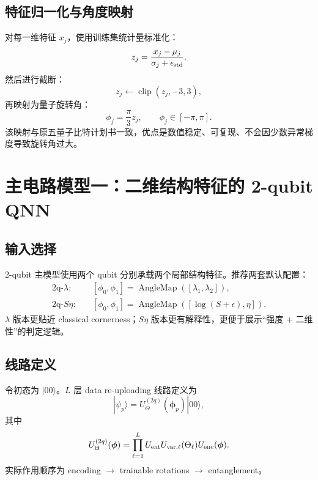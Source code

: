 \documentclass[UTF8,zihao=-4]{ctexart}
\newcommand{\clip}{\operatorname{clip}}
\begin{document}
\subsection{特征归一化与角度映射}

对每一维特征 $x_j$，使用训练集统计量标准化：
\begin{equation}
    z_j=\frac{x_j-\mu_j}{\sigma_j+\epsilon_{\rm std}}.
\end{equation}
然后进行截断：
\begin{equation}
    z_j\leftarrow \clip(z_j,-3,3),
\end{equation}
再映射为量子旋转角：
\begin{equation}
    \phi_j=\frac{\pi}{3} z_j,
    \qquad \phi_j\in[-\pi,\pi].
\end{equation}
该映射与原五量子比特计划书一致，优点是数值稳定、可复现、不会因少数异常梯度导致旋转角过大。

\section{主电路模型一：二维结构特征的 2-qubit QNN}

\subsection{输入选择}

2-qubit 主模型使用两个 qubit 分别承载两个局部结构特征。推荐两套默认配置：
\begin{align}
    \text{2q-}\lambda: \quad & [\phi_0,\phi_1] = \operatorname{AngleMap}([\lambda_1,\lambda_2]),\\
    \text{2q-}S\eta: \quad & [\phi_0,\phi_1] = \operatorname{AngleMap}([\log(S+\epsilon),\eta]).
\end{align}
$\lambda$ 版本更贴近 classical cornerness；$S\eta$ 版本更有解释性，更便于展示“强度 + 二维性”的判定逻辑。

\subsection{线路定义}

令初态为 $|00\rangle$。$L$ 层 data re-uploading 线路定义为
\begin{equation}
    |\psi_p\rangle = U^{(2q)}_\Theta(\bm\phi_p)|00\rangle,
\end{equation}
其中
\begin{equation}
    U^{(2q)}_\Theta(\bm\phi)=\prod_{\ell=1}^{L}
    U_{\rm ent}U_{{\rm var},\ell}(\Theta_\ell)U_{\rm enc}(\bm\phi).
\end{equation}
实际作用顺序为 encoding $\rightarrow$ trainable rotations $\rightarrow$ entanglement。
\end{document}
